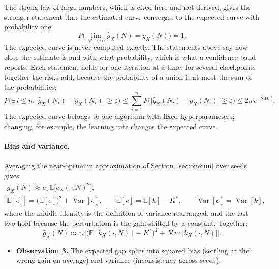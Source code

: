 \documentclass[11pt]{article}
\begin{document}
The strong law of large numbers, which is cited here and not derived, gives the stronger statement
that the estimated curve converges to the expected curve with probability one:
\[
  P\Big(\lim_{M \to \infty} \hat g_X(N) = \bar g_X(N)\Big) = 1 .
\]
The expected curve is never computed exactly. The statements above say how close the estimate is and
with what probability, which is what a confidence band reports. Each statement holds for one
iteration at a time; for several checkpoints together the risks add, because the probability of a
union is at most the sum of the probabilities:
\[
  P\Big(\exists\, i \le n : \big|\hat g_X(N_i) - \bar g_X(N_i)\big| \ge \varepsilon\Big)
  \le \sum_{i=1}^{n} P\Big(\big|\hat g_X(N_i) - \bar g_X(N_i)\big| \ge \varepsilon\Big)
  \le 2 n\, e^{-2 M \varepsilon^2} .
\]
The expected curve belongs to one algorithm with fixed hyperparameters; changing, for example, the
learning rate changes the expected curve.

\paragraph{Bias and variance.} Averaging the near-optimum approximation of Section~\ref{sec:onerun} over seeds gives
\begin{gather*}
  \bar g_X(N) \approx c_\gamma\, \mathbb{E}\big[e_X(\cdot, N)^2\big], \\
  \mathbb{E}[e^2] = \big(\mathbb{E}[e]\big)^2 + \operatorname{Var}[e], \qquad
  \mathbb{E}[e] = \mathbb{E}[k] - K^*, \qquad \operatorname{Var}[e] = \operatorname{Var}[k],
\end{gather*}
where the middle identity is the definition of variance rearranged, and the last two hold because
the perturbation is the gain shifted by a constant. Together:
\[
  \bar g_X(N) \approx c_\gamma \Big[\big(\mathbb{E}[k_X(\cdot, N)] - K^*\big)^2
  + \operatorname{Var}\big[k_X(\cdot, N)\big]\Big].
\]
\begin{itemize}[leftmargin=*]
  \item \textbf{Observation 3.} The expected gap splits into squared bias (settling at the wrong gain
    on average) and variance (inconsistency across seeds).
\end{itemize}
\end{document}
